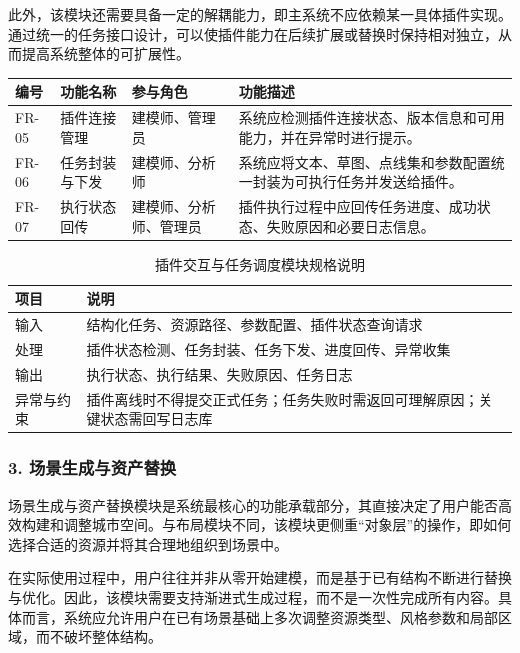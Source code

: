\documentclass[UTF8,a4paper,10pt]{ctexart}
\begin{document}
此外，该模块还需要具备一定的解耦能力，即主系统不应依赖某一具体插件实现。通过统一的任务接口设计，可以使插件能力在后续扩展或替换时保持相对独立，从而提高系统整体的可扩展性。
{
\renewcommand{\arraystretch}{1.35}

\begin{longtable}{p{1.8cm} p{2.5cm} p{2.1cm} p{6.4cm}}
\toprule
\rowcolor{gray!20}
编号 & 功能名称 & 参与角色 & 功能描述 \\
\midrule
FR-05 & 插件连接管理 & 建模师、管理员 & 系统应检测插件连接状态、版本信息和可用能力，并在异常时进行提示。 \\
FR-06 & 任务封装与下发 & 建模师、分析师 & 系统应将文本、草图、点线集和参数配置统一封装为可执行任务并发送给插件。 \\
FR-07 & 执行状态回传 & 建模师、分析师、管理员 & 插件执行过程中应回传任务进度、成功状态、失败原因和必要日志信息。 \\
\bottomrule
\end{longtable}
}

{
\renewcommand{\arraystretch}{1.3}

\begin{table}[H]
\centering
\caption{插件交互与任务调度模块规格说明}
\begin{tabularx}{\textwidth}{p{2.6cm} Y}
\toprule
{}
项目 & 说明 \\
\midrule
输入 & 结构化任务、资源路径、参数配置、插件状态查询请求 \\
处理 & 插件状态检测、任务封装、任务下发、进度回传、异常收集 \\
输出 & 执行状态、执行结果、失败原因、任务日志 \\
异常与约束 & 插件离线时不得提交正式任务；任务失败时需返回可理解原因；关键状态需回写日志库 \\
\bottomrule
\end{tabularx}
\end{table}
}

\subsubsection*{3. 场景生成与资产替换}
场景生成与资产替换模块是系统最核心的功能承载部分，其直接决定了用户能否高效构建和调整城市空间。与布局模块不同，该模块更侧重“对象层”的操作，即如何选择合适的资源并将其合理地组织到场景中。

在实际使用过程中，用户往往并非从零开始建模，而是基于已有结构不断进行替换与优化。因此，该模块需要支持渐进式生成过程，而不是一次性完成所有内容。具体而言，系统应允许用户在已有场景基础上多次调整资源类型、风格参数和局部区域，而不破坏整体结构。
\end{document}
